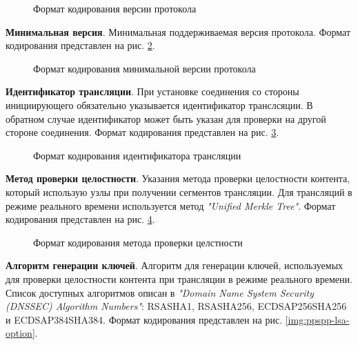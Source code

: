 		\begin{figure}[h]
			\caption{Формат кодирования версии протокола}
			\label{img:ppspp-version-option}
		\end{figure}

		\textbf{Минимальная версия}. Минимальная поддерживаемая версия протокола. Формат кодирования представлен на рис.
		 \ref{img:ppspp-min-version-option}.

		\begin{figure}[h]
			\caption{Формат кодирования минимальной версии протокола}
			\label{img:ppspp-min-version-option}
		\end{figure}

		\textbf{Идентификатор трансляции}. При установке соединения со стороны инициирующего обязательно указывается
		идентификатор транслсяции. В обратном случае идентификатор может быть указан для проверки на другой стороне
		соединения. Формат кодирования представлен на рис. \ref{img:ppspp-swarm-id-option}.

		\begin{figure}[h]
			\caption{Формат кодирования идентификатора трансляции}
			\label{img:ppspp-swarm-id-option}
		\end{figure}

		\textbf{Метод проверки целостности}. Указания метода проверки целостности контента, который использую узлы при
		получении сегментов трансляции. Для трансляций в режиме реального времени используется метод
		\textit{"Unified Merkle Tree"}. Формат кодирования представлен на рис. \ref{img:ppspp-cimp-option}.

		\begin{figure}[h]
			\caption{Формат кодирования метода проверки целстности}
			\label{img:ppspp-cimp-option}
		\end{figure}

		\textbf{Алгоритм генерации ключей}. Алгоритм для генерации ключей, используемых для проверки целостности
		контента при трансляции в режиме реального времени. Список доступных алгоритмов описан в
		\textit{"Domain Name System Security (DNSSEC) Algorithm Numbers"}: RSASHA1, RSASHA256, ECDSAP256SHA256 и
		ECDSAP384SHA384. Формат кодирования представлен на рис. \ref{img:ppspp-lsa-option}.

